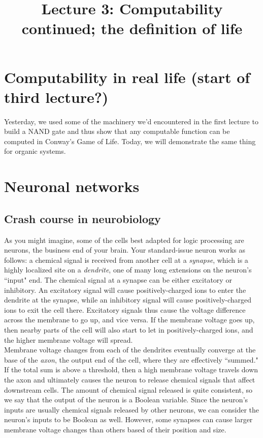 \documentclass{article}
\begin{document}
\large

\title{Lecture 3: Computability continued; the definition of life}
\maketitle

\section*{Computability in real life (start of third lecture?)}

Yesterday, we used some of the machinery we'd encountered in the first lecture to build a NAND gate and thus show that any computable function can be computed in Conway's Game of Life. Today, we will demonstrate the same thing for organic systems.

\section*{Neuronal networks}

\subsection*{Crash course in neurobiology}

As you might imagine, some of the cells best adapted for logic processing are neurons, the business end of your brain. Your standard-issue neuron works as follows: a chemical signal is received from another cell at a \textit{synapse}, which is a highly localized site on a \textit{dendrite}, one of many long extensions on the neuron's ``input" end. The chemical signal at a synapse can be either excitatory or inhibitory. An excitatory signal will cause positively-charged ions to enter the dendrite at the synapse, while an inhibitory signal will cause positively-charged ions to exit the cell there. Excitatory signals thus cause the voltage difference across the membrane to go up, and vice versa. If the membrane voltage goes up, then nearby parts of the cell will also start to let in positively-charged ions, and the higher membrane voltage will spread.\\

Membrane voltage changes from each of the dendrites eventually converge at the base of the \textit{axon}, the output end of the cell, where they are effectively ``summed." If the total sum is above a threshold, then a high membrane voltage travels down the axon and ultimately causes the neuron to release chemical signals that affect downstream cells. The amount of chemical signal released is quite consistent, so we say that the output of the neuron is a Boolean variable. Since the neuron's inputs are usually chemical signals released by other neurons, we can consider the neuron's inputs to be Boolean as well. However, some synapses can cause larger membrane voltage changes than others based of their position and size.
\end{document}

